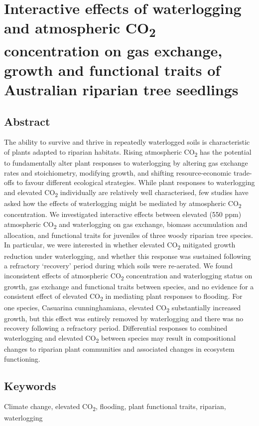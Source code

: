\documentclass[12pt,a4paper]{memoir}
\begin{document}
\doublespacing


\chapter[glasshouse]{Interactive effects of waterlogging and atmospheric CO\textsubscript{2} concentration on gas exchange, growth and functional traits of Australian riparian tree seedlings}
\newpage

\section*{Abstract}
The ability to survive and thrive in repeatedly waterlogged soils is characteristic of plants adapted to riparian habitats. Rising atmospheric CO\textsubscript{2} has the potential to fundamentally alter plant responses to waterlogging by altering gas exchange rates and stoichiometry, modifying growth, and shifting resource-economic trade-offs to favour different ecological strategies. While plant responses to waterlogging and elevated CO\textsubscript{2} individually are relatively well characterised, few studies have asked how the effects of waterlogging might be mediated by atmospheric CO\textsubscript{2} concentration. We investigated interactive effects between elevated (550 ppm) atmospheric CO\textsubscript{2} and waterlogging on gas exchange, biomass accumulation and allocation, and functional traits for juveniles of three woody riparian tree species. In particular, we were interested in whether elevated CO\textsubscript{2} mitigated growth reduction under waterlogging, and whether this response was sustained following a refractory ‘recovery’ period during which soils were re-aerated. We found inconsistent effects of atmospheric CO\textsubscript{2} concentration and waterlogging status on growth, gas exchange and functional traits between species, and no evidence for a consistent effect of elevated CO\textsubscript{2} in mediating plant responses to flooding. For one species, Casuarina cunninghamiana, elevated CO\textsubscript{2} substantially increased growth, but this effect was entirely removed by waterlogging and there was no recovery following a refractory period. Differential responses to combined waterlogging and elevated CO\textsubscript{2} between species may result in compositional changes to riparian plant communities and associated changes in ecosystem functioning.

\section*{Keywords}
Climate change, elevated CO\textsubscript{2}, flooding, plant functional traits, riparian, waterlogging
\end{document}
